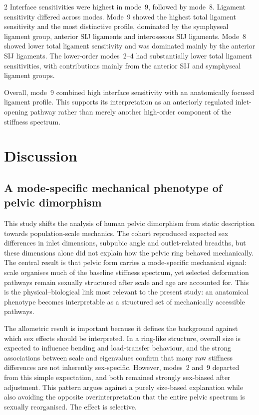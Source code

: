 \documentclass[openacc]{rsproca_new}
\begin{document}
\begin{multicols}{2}
Interface sensitivities were highest in mode~9, followed by mode~8. Ligament sensitivity differed across modes. Mode~9 showed the highest total ligament sensitivity and the most distinctive profile, dominated by the symphyseal ligament group, anterior SIJ ligaments and interosseous SIJ ligaments. Mode~8 showed lower total ligament sensitivity and was dominated mainly by the anterior SIJ ligaments. The lower-order modes~2--4 had substantially lower total ligament sensitivities, with contributions mainly from the anterior SIJ and symphyseal ligament groups.

Overall, mode~9 combined high interface sensitivity with an anatomically focused ligament profile. This supports its interpretation as an anteriorly regulated inlet-opening pathway rather than merely another high-order component of the stiffness spectrum.

\section{Discussion}
\subsection{A mode-specific mechanical phenotype of pelvic dimorphism}

This study shifts the analysis of human pelvic dimorphism from static description towards population-scale mechanics. The cohort reproduced expected sex differences in inlet dimensions, subpubic angle and outlet-related breadths, but these dimensions alone did not explain how the pelvic ring behaved mechanically. The central result is that pelvic form carries a mode-specific mechanical signal: scale organises much of the baseline stiffness spectrum, yet selected deformation pathways remain sexually structured after scale and age are accounted for. This is the physical--biological link most relevant to the present study: an anatomical phenotype becomes interpretable as a structured set of mechanically accessible pathways.

The allometric result is important because it defines the background against which sex effects should be interpreted. In a ring-like structure, overall size is expected to influence bending and load-transfer behaviour, and the strong associations between scale and eigenvalues confirm that many raw stiffness differences are not inherently sex-specific. However, modes~2 and~9 departed from this simple expectation, and both remained strongly sex-biased after adjustment. This pattern argues against a purely size-based explanation while also avoiding the opposite overinterpretation that the entire pelvic spectrum is sexually reorganised. The effect is selective.


\end{multicols}
\end{document}
